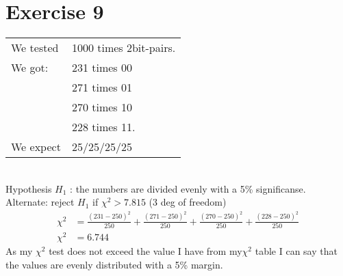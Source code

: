 \section{Exercise 9}
\begin{tabular}{ll}
We tested &1000 times 2bit-pairs.\\
We got:   &231 times 00\\
		  &271 times 01\\
		  &270 times 10\\
		  &228 times 11.\\
We expect &	25/25/25/25
\end{tabular}\\
Hypothesis $H_1$ : the numbers are divided evenly with a 5\% significanse.\\
Alternate: reject $H_1$ if $\chi^2 > 7.815$ (3 deg of freedom)\\
\begin{equation*}
\begin{split}
\chi^2	&=\frac{(231-250)^2}{250} + \frac{(271-250)^2}{250} +
\frac{(270-250)^2}{250} + \frac{(228-250)^2}{250}\\
\chi^2	&= 6.744
\end{split}
\end{equation*}
As my $\chi^2$ test does not exceed the value I have from my$\chi^2$
table\cite{Prob} I can say that the values are evenly distributed with a 5\%
margin.

